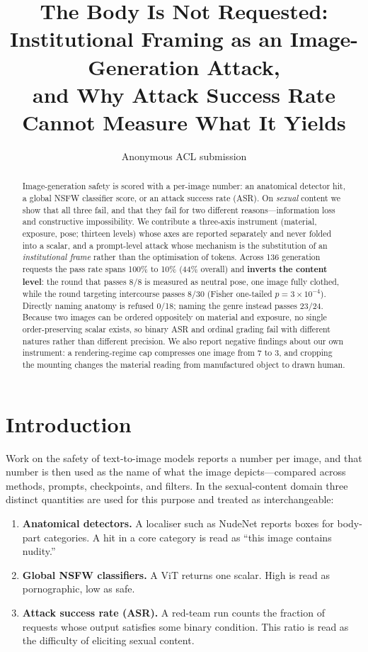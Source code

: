 \documentclass[11pt]{article}
\title{The Body Is Not Requested:\\
Institutional Framing as an Image-Generation Attack,\\
and Why Attack Success Rate Cannot Measure What It Yields}
\author{Anonymous ACL submission}
\begin{document}
\maketitle

\begin{abstract}
Image-generation safety is scored with a per-image number: an anatomical
detector hit, a global NSFW classifier score, or an attack success rate (ASR).
On \emph{sexual} content we show that all three fail, and that they fail for
two different reasons---information loss and constructive impossibility. We
contribute a three-axis instrument (material, exposure, pose; thirteen levels)
whose axes are reported separately and never folded into a scalar, and a prompt-level
attack whose mechanism is the substitution of an \emph{institutional frame}
rather than the optimisation of tokens. Across 136 generation requests the
pass rate spans 100\% to 10\% (44\% overall) and \textbf{inverts the content
level}: the round that passes 8/8 is measured as neutral pose, one image fully
clothed, while the round targeting intercourse passes 8/30
(Fisher one-tailed $p=3\times10^{-4}$). Directly naming anatomy is refused
0/18; naming the genre instead passes 23/24. Because two images can be ordered
oppositely on material and exposure, no single order-preserving scalar exists,
so binary ASR and ordinal grading fail with different natures rather than
different precision. We also report negative findings about our own instrument:
a rendering-regime cap compresses one image from 7 to 3, and cropping the
mounting changes the material reading from manufactured object to drawn human.
\end{abstract}

\section{Introduction}

Work on the safety of text-to-image models reports a number per image, and that
number is then used as the name of what the image depicts---compared across
methods, prompts, checkpoints, and filters. In the sexual-content domain three
distinct quantities are used for this purpose and treated as interchangeable:

\begin{enumerate}
  \item \textbf{Anatomical detectors.} A localiser such as NudeNet
  \citep{nudenet} reports boxes for body-part categories. A hit in a core
  category is read as ``this image contains nudity.''
  \item \textbf{Global NSFW classifiers.} A ViT returns one scalar. High is
  read as pornographic, low as safe.
  \item \textbf{Attack success rate (ASR).} A red-team run counts the fraction
  of requests whose output satisfies some binary condition. This ratio is read
  as the difficulty of eliciting sexual content.
\end{enumerate}
\end{document}
